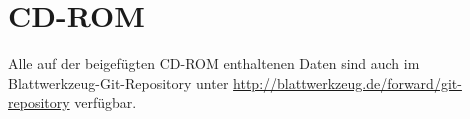 
\section{CD-ROM}
Alle auf der beigefügten CD-ROM enthaltenen Daten sind auch im Blattwerkzeug-Git-Repository unter \url{http://blattwerkzeug.de/forward/git-repository} verfügbar.